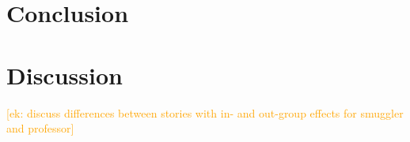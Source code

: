 \documentclass[10pt,letterpaper]{article}
\newcommand{\ek}[1]{\textcolor{Orange}{[ek: #1]}}
\begin{document}
\section{Conclusion}

\section{Discussion}
\ek{discuss differences between stories with in- and out-group effects for smuggler and professor}




\setlength{\bibleftmargin}{.125in}
\setlength{\bibindent}{-\bibleftmargin}





\end{document}
